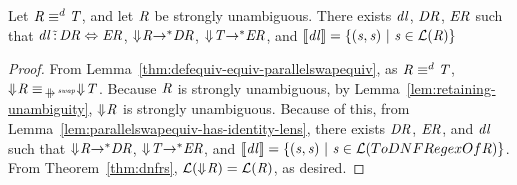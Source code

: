 \documentclass[numbers,10pt,preprint\ifanon ,nocopyrightspace\fi]{sigplanconf}
\begin{document}
\begin{lemma}
  \label{lem:identity-definitional-equivalence}
  Let $\mathit{R} \equiv^d \mathit{T}$, and let $\mathit{R}$ be strongly
  unambiguous.  There exists $\mathit{dl}$, $\mathit{DR}$, $\mathit{ER}$ such that
  $\mathit{dl} \,\tilde{:}\, \mathit{DR} \Leftrightarrow \mathit{ER}$,
  $\Downarrow\mkern-4mu \mathit{R} {\rightarrow}^* \mathit{DR}$,
  $\Downarrow\mkern-4mu \mathit{T} {\rightarrow}^* \mathit{ER}$, and
  $[ \! [\mathit{dl}] \! ] =
  \{(\mathit{s},\mathit{s}) ~|~ \mathit{s}\in\mathcal{L}(\mathit{R})\}$
\end{lemma}
\begin{proof}
  From Lemma~\ref{thm:defequiv-equiv-parallelswapequiv}, as 
  $\mathit{R} \equiv^d \mathit{T}$,
  $\ToDNFRegexOf{\Regex} \EquivalenceOf{\ParallelRewriteSwap}
  \ToDNFRegexOf{\RegexAlt}$.
  Because $\mathit{R}$ is strongly unambiguous, by
  Lemma~\ref{lem:retaining-unambiguity}, $\Downarrow\mkern-4mu \mathit{R}$ is strongly
  unambiguous.
  Because of this, from Lemma~\ref{lem:parallelswapequiv-has-identity-lens},
  there exists $\mathit{DR}$, $\mathit{ER}$, and $\mathit{dl}$ such that
  $\Downarrow\mkern-4mu \mathit{R} {\rightarrow}^* \mathit{DR}$,
  $\Downarrow\mkern-4mu \mathit{T} {\rightarrow}^* \mathit{ER}$, and
  $[ \! [\mathit{dl}] \! ] =
  \{(\mathit{s},\mathit{s}) ~|~
    \mathit{s}\in\mathcal{L}(ToDNFRegexOf{\mathit{R}})\}$.
  From Theorem~\ref{thm:dnfrs}, $\mathcal{L}(\Downarrow\mkern-4mu \mathit{R}) =
  \mathcal{L}(\mathit{R})$, as desired.
\end{proof}
\end{document}
